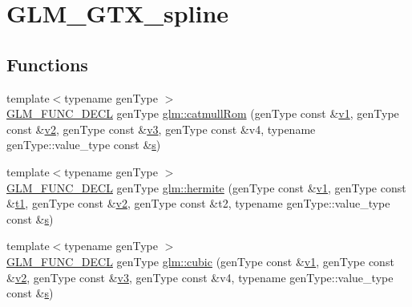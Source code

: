 \hypertarget{group__gtx__spline}{}\section{G\+L\+M\+\_\+\+G\+T\+X\+\_\+spline}
\label{group__gtx__spline}
\subsection*{Functions}
\begin{DoxyCompactItemize}
\item 
{\footnotesize template$<$typename gen\+Type $>$ }\\\mbox{\hyperlink{setup_8hpp_ab2d052de21a70539923e9bcbf6e83a51}{G\+L\+M\+\_\+\+F\+U\+N\+C\+\_\+\+D\+E\+CL}} gen\+Type \mbox{\hyperlink{group__gtx__spline_ga8119c04f8210fd0d292757565cd6918d}{glm\+::catmull\+Rom}} (gen\+Type const \&\mbox{\hyperlink{_s_d_l__opengl__glext_8h_a435c176a02c061b43e19bdf7c86cceae}{v1}}, gen\+Type const \&\mbox{\hyperlink{_s_d_l__opengl__glext_8h_a0928f6d0f0f794ba000a21dfae422136}{v2}}, gen\+Type const \&\mbox{\hyperlink{_s_d_l__opengl__glext_8h_acc806b31cbf466ceba6555983d8b814d}{v3}}, gen\+Type const \&v4, typename gen\+Type\+::value\+\_\+type const \&\mbox{\hyperlink{_s_d_l__opengl_8h_a4af680a6c683f88ed67b76f207f2e6e4}{s}})
\item 
{\footnotesize template$<$typename gen\+Type $>$ }\\\mbox{\hyperlink{setup_8hpp_ab2d052de21a70539923e9bcbf6e83a51}{G\+L\+M\+\_\+\+F\+U\+N\+C\+\_\+\+D\+E\+CL}} gen\+Type \mbox{\hyperlink{group__gtx__spline_gaa69e143f6374d32f934a8edeaa50bac9}{glm\+::hermite}} (gen\+Type const \&\mbox{\hyperlink{_s_d_l__opengl__glext_8h_a435c176a02c061b43e19bdf7c86cceae}{v1}}, gen\+Type const \&\mbox{\hyperlink{_s_d_l__opengl__glext_8h_af48031a37b713afa3b0d0d7d29653d7c}{t1}}, gen\+Type const \&\mbox{\hyperlink{_s_d_l__opengl__glext_8h_a0928f6d0f0f794ba000a21dfae422136}{v2}}, gen\+Type const \&t2, typename gen\+Type\+::value\+\_\+type const \&\mbox{\hyperlink{_s_d_l__opengl_8h_a4af680a6c683f88ed67b76f207f2e6e4}{s}})
\item 
{\footnotesize template$<$typename gen\+Type $>$ }\\\mbox{\hyperlink{setup_8hpp_ab2d052de21a70539923e9bcbf6e83a51}{G\+L\+M\+\_\+\+F\+U\+N\+C\+\_\+\+D\+E\+CL}} gen\+Type \mbox{\hyperlink{group__gtx__spline_ga6b867eb52e2fc933d2e0bf26aabc9a70}{glm\+::cubic}} (gen\+Type const \&\mbox{\hyperlink{_s_d_l__opengl__glext_8h_a435c176a02c061b43e19bdf7c86cceae}{v1}}, gen\+Type const \&\mbox{\hyperlink{_s_d_l__opengl__glext_8h_a0928f6d0f0f794ba000a21dfae422136}{v2}}, gen\+Type const \&\mbox{\hyperlink{_s_d_l__opengl__glext_8h_acc806b31cbf466ceba6555983d8b814d}{v3}}, gen\+Type const \&v4, typename gen\+Type\+::value\+\_\+type const \&\mbox{\hyperlink{_s_d_l__opengl_8h_a4af680a6c683f88ed67b76f207f2e6e4}{s}})
\end{DoxyCompactItemize}


